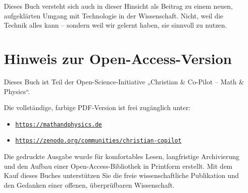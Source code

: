 Dieses Buch versteht sich auch in dieser Hinsicht als Beitrag zu einem neuen, aufgeklärten Umgang mit Technologie in der Wissenschaft. Nicht, weil die Technik alles kann – sondern weil wir gelernt haben, sie sinnvoll zu nutzen.

\vspace{1em}



\section*{Hinweis zur Open-Access-Version}

Dieses Buch ist Teil der Open-Science-Initiative „Christian \& Co-Pilot – Math \& Physics“.

Die vollständige, farbige PDF-Version ist frei zugänglich unter:

\begin{itemize}
	\item \href{https://mathandphysics.de}{\texttt{https://mathandphysics.de}}
	\item \href{https://zenodo.org/communities/christian-copilot}{\texttt{https://zenodo.org/communities/christian-copilot}}
\end{itemize}

Die gedruckte Ausgabe wurde für komfortables Lesen, langfristige Archivierung
und den Aufbau einer Open-Access-Bibliothek in Printform erstellt.
Mit dem Kauf dieses Buches unterstützen Sie die freie wissenschaftliche Publikation
und den Gedanken einer offenen, überprüfbaren Wissenschaft.
